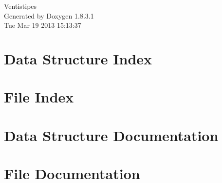 \documentclass{book}
\begin{document}
\hypersetup{pageanchor=false,citecolor=blue}
\begin{titlepage}
\vspace*{7cm}
\begin{center}
{\Large Ventistipes }\\
\vspace*{1cm}
{\large Generated by Doxygen 1.8.3.1}\\
\vspace*{0.5cm}
{\small Tue Mar 19 2013 15:13:37}\\
\end{center}
\end{titlepage}
\clearemptydoublepage
{}
\tableofcontents
\clearemptydoublepage
{}
\hypersetup{pageanchor=true,citecolor=blue}
\chapter{Data Structure Index}

\chapter{File Index}

\chapter{Data Structure Documentation}




\chapter{File Documentation}



















\printindex
\end{document}
